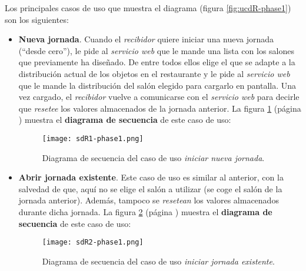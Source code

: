 Los principales casos de uso que muestra el diagrama (figura
\ref{fig:ucdR-phase1}) son los siguientes:
\begin{itemize}
\item \textbf{Nueva jornada}. Cuando el \emph{recibidor} quiere iniciar una
nueva jornada (``desde cero''), le pide al \emph{servicio web} que le mande 
una lista con los salones que previamente ha diseñado. De entre todos ellos
elige el que se adapte a la distribución actual de los objetos en el
restaurante y le pide al \emph{servicio web} que le mande la distribución del
salón elegido para cargarlo en pantalla. Una vez cargado, el \emph{recibidor}
vuelve a comunicarse con el \emph{servicio web} para decirle que \emph{resetee}
los valores almacenados de la jornada anterior. La figura \ref{fig:sdR1-phase1}
(página \pageref{fig:sdR1-phase1}) muestra el \textbf{diagrama de secuencia} 
de este caso de uso:


  \begin{figure}[!h]
    \begin{center}
      \texttt{[image: sdR1-phase1.png]}
      \caption{Diagrama de secuencia del caso de uso \emph{iniciar nueva
      jornada}.}
      \label{fig:sdR1-phase1}
    \end{center}
  \end{figure}

\item \textbf{Abrir jornada existente}. Este caso de uso es similar al
anterior, con la salvedad de que, aquí no se elige el salón a
utilizar (se coge el salón de la jornada anterior). Además, tampoco se
\emph{resetean} los valores almacenados durante dicha jornada. La figura
\ref{fig:sdR2-phase1} (página \pageref{fig:sdR2-phase1}) muestra el
\textbf{diagrama de secuencia} de este caso de uso:

  \begin{figure}[!h]
    \begin{center}
      \texttt{[image: sdR2-phase1.png]}
      \caption{Diagrama de secuencia del caso de uso \emph{iniciar jornada
      existente}.}
      \label{fig:sdR2-phase1}
    \end{center}
  \end{figure}


\end{itemize}
